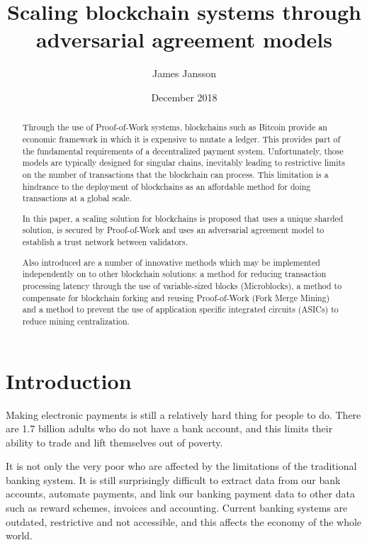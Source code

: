 \documentclass[a4paper,12pt]{article}
\begin{document}
\title{Scaling blockchain systems through adversarial agreement models}
\author{James Jansson}
\date{December 2018} 
\maketitle


\begin{abstract}
Through the use of Proof-of-Work systems, blockchains such as Bitcoin provide an economic framework in which it is expensive to mutate a ledger. This provides part of the fundamental requirements of a decentralized payment system. Unfortunately, those models are typically designed for singular chains, inevitably leading to restrictive limits on the number of transactions that the blockchain can process. This limitation is a hindrance to the deployment of blockchains as an affordable method for doing transactions at a global scale. 

In this paper, a scaling solution for blockchains is proposed that uses a unique sharded solution, is secured by Proof-of-Work and uses an adversarial agreement model to establish a trust network between validators.

Also introduced are a number of innovative methods which may be implemented independently on to other blockchain solutions: a method for reducing transaction processing latency through the use of variable-sized blocks (Microblocks), a method to compensate for blockchain forking and reusing Proof-of-Work (Fork Merge Mining) and a method to prevent the use of application specific integrated circuits (ASICs) to reduce mining centralization. 
\end{abstract}

\newpage

\tableofcontents

\newpage

\section{Introduction}
Making electronic payments is still a relatively hard thing for people to do. There are 1.7 billion adults who do not have a bank account, and this limits their ability to trade and lift themselves out of poverty.

It is not only the very poor who are affected by the limitations of the traditional banking system. It is still surprisingly difficult to extract data from our bank accounts, automate payments, and link our banking payment data to other data such as reward schemes, invoices and accounting. Current banking systems are outdated, restrictive and not accessible, and this affects the economy of the whole world. 
\end{document}
